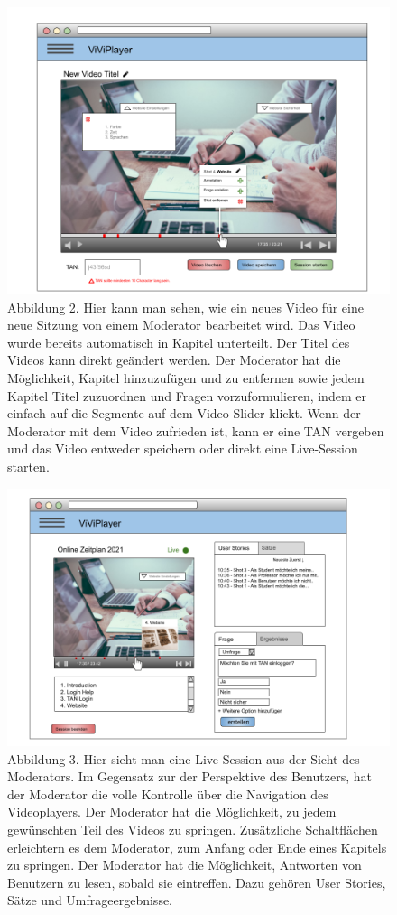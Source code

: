 \begin{figure}
  \includegraphics[width=\linewidth]{5dot2.png}
  \caption{Abbildung 2. Hier kann man sehen, wie ein neues Video für eine neue Sitzung von einem Moderator bearbeitet wird. Das Video wurde bereits automatisch in Kapitel unterteilt. Der Titel des Videos kann direkt geändert werden. Der Moderator hat die Möglichkeit, Kapitel hinzuzufügen und zu entfernen sowie jedem Kapitel Titel zuzuordnen und Fragen vorzuformulieren, indem er einfach auf die Segmente auf dem Video-Slider klickt. Wenn der Moderator mit dem Video zufrieden ist, kann er eine TAN vergeben und das Video entweder speichern oder direkt eine Live-Session starten.}
  \label{fig:5dot2}
\end{figure}

\begin{figure}
  \includegraphics[width=\linewidth]{5dot3.png}
  \caption{Abbildung 3. Hier sieht man eine Live-Session aus der Sicht des Moderators. Im Gegensatz zur der Perspektive des Benutzers, hat der Moderator die volle Kontrolle über die Navigation des Videoplayers. Der Moderator hat die Möglichkeit, zu jedem gewünschten Teil des Videos zu springen. Zusätzliche Schaltflächen erleichtern es dem Moderator, zum Anfang oder Ende eines Kapitels zu springen. Der Moderator hat die Möglichkeit, Antworten von Benutzern zu lesen, sobald sie eintreffen. Dazu gehören User Stories, Sätze und Umfrageergebnisse.}
  \label{fig:5dot3}
\end{figure}
